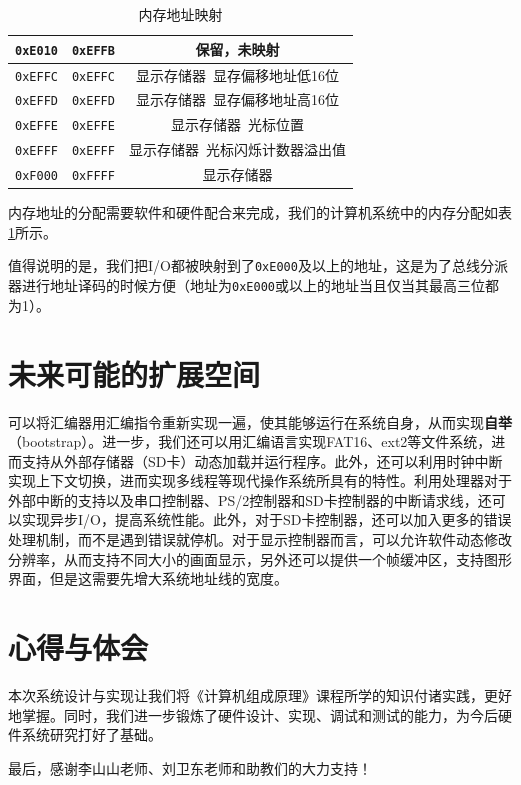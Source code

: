 \documentclass[11pt,utf8]{report}
\begin{document}
\begin{table}[h]
\begin{tabular}{c|c|c}
\texttt{0xE010} & \texttt{0xEFFB} & 保留，未映射 \\ \hline
\texttt{0xEFFC} & \texttt{0xEFFC} & 显示存储器~显存偏移地址低16位 \\ \hline
\texttt{0xEFFD} & \texttt{0xEFFD} & 显示存储器~显存偏移地址高16位 \\ \hline
\texttt{0xEFFE} & \texttt{0xEFFE} & 显示存储器~光标位置 \\ \hline
\texttt{0xEFFF} & \texttt{0xEFFF} & 显示存储器~光标闪烁计数器溢出值 \\ \hline
\texttt{0xF000} & \texttt{0xFFFF} & 显示存储器 \\
\bottomrule[1.2pt]
\end{tabular}
\caption{内存地址映射}
\label{mmap}
\end{table}
	内存地址的分配需要软件和硬件配合来完成，我们的计算机系统中的内存分配如表\ref{mmap}所示。

	\par 值得说明的是，我们把I/O都被映射到了\texttt{0xE000}及以上的地址，这是为了总线分派器进行地址译码的时候方便（地址为\texttt{0xE000}或以上的地址当且仅当其最高三位都为1）。

\chapter{未来可能的扩展空间}
	\par 可以将汇编器用汇编指令重新实现一遍，使其能够运行在系统自身，从而实现\textbf{自举}（bootstrap）。进一步，我们还可以用汇编语言实现FAT16、ext2等文件系统，进而支持从外部存储器（SD卡）动态加载并运行程序。此外，还可以利用时钟中断实现上下文切换，进而实现多线程等现代操作系统所具有的特性。利用处理器对于外部中断的支持以及串口控制器、PS/2控制器和SD卡控制器的中断请求线，还可以实现异步I/O，提高系统性能。此外，对于SD卡控制器，还可以加入更多的错误处理机制，而不是遇到错误就停机。对于显示控制器而言，可以允许软件动态修改分辨率，从而支持不同大小的画面显示，另外还可以提供一个帧缓冲区，支持图形界面，但是这需要先增大系统地址线的宽度。

\chapter{心得与体会}
	\par 本次系统设计与实现让我们将《计算机组成原理》课程所学的知识付诸实践，更好地掌握。同时，我们进一步锻炼了硬件设计、实现、调试和测试的能力，为今后硬件系统研究打好了基础。
	\par 最后，感谢李山山老师、刘卫东老师和助教们的大力支持！
\end{document}
